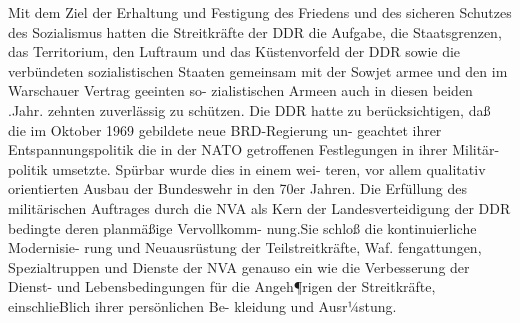 

Mit dem Ziel der Erhaltung und Festigung des
Friedens und des sicheren Schutzes des Sozialismus
hatten die Streitkräfte der DDR die Aufgabe, die
Staatsgrenzen, das Territorium, den Luftraum und
das Küstenvorfeld der DDR sowie die verbündeten
sozialistischen Staaten gemeinsam mit der Sowjet
armee und den im Warschauer Vertrag geeinten so-
zialistischen Armeen auch in diesen beiden .Jahr.
zehnten zuverlässig zu schützen.
Die DDR hatte zu berücksichtigen, daß die im
Oktober 1969 gebildete neue BRD-Regierung un-
geachtet ihrer Entspannungspolitik die in der
NATO getroffenen Festlegungen in ihrer Militär-
politik umsetzte. Spürbar wurde dies in einem wei-
teren, vor allem qualitativ orientierten Ausbau der
Bundeswehr in den 70er Jahren.
Die Erfüllung des militärischen Auftrages durch
die NVA als Kern der Landesverteidigung der
DDR bedingte deren planmäßige Vervollkomm-
nung.Sie schloß die kontinuierliche Modernisie-
rung und Neuausrüstung der Teilstreitkräfte, Waf.
fengattungen, Spezialtruppen und Dienste der
NVA genauso ein wie die Verbesserung der Dienst-
und Lebensbedingungen für die Angeh¶rigen der
Streitkräfte, einschlieBlich ihrer persönlichen Be-
kleidung und Ausr¼stung.

